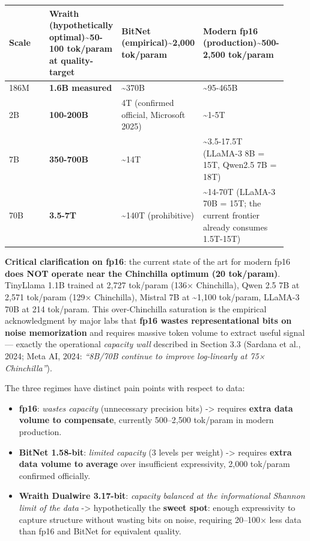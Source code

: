 {\def\LTcaptype{none} %
{\footnotesize\setlength{\tabcolsep}{3pt}
\begin{longtable}[]{@{}>{\raggedright\arraybackslash}p{0.230\linewidth}>{\raggedright\arraybackslash}p{0.230\linewidth}>{\raggedright\arraybackslash}p{0.230\linewidth}>{\raggedright\arraybackslash}p{0.230\linewidth}@{}}
\toprule\noalign{}
Scale & \textbf{Wraith (hypothetically optimal)}\textasciitilde50-100 tok/param
at quality-target & BitNet (empirical)\textasciitilde2,000 tok/param & Modern fp16 (production)\textasciitilde500-2,500 tok/param \\
\midrule\noalign{}
\endhead
\bottomrule\noalign{}
\endlastfoot
186M & \textbf{1.6B measured} & \textasciitilde370B &
\textasciitilde95-465B \\
2B & \textbf{100-200B} & 4T (confirmed official, Microsoft 2025) &
\textasciitilde1-5T \\
7B & \textbf{350-700B} & \textasciitilde14T & \textasciitilde3.5-17.5T
(LLaMA-3 8B = 15T, Qwen2.5 7B = 18T) \\
70B & \textbf{3.5-7T} & \textasciitilde140T (prohibitive) &
\textasciitilde14-70T (LLaMA-3 70B = 15T; the current frontier already
consumes 1.5T-15T) \\
\end{longtable}
}
}

\textbf{Critical clarification on fp16}: the current state of the art
for modern fp16 \textbf{does NOT operate near the Chinchilla optimum (20
tok/param)}. TinyLlama 1.1B trained at 2,727 tok/param (136×
Chinchilla), Qwen 2.5 7B at 2,571 tok/param (129× Chinchilla), Mistral
7B at \textasciitilde1,100 tok/param, LLaMA-3 70B at 214 tok/param. This
over-Chinchilla saturation is the empirical acknowledgment by major labs
that \textbf{fp16 wastes representational bits on noise memorization}
and requires massive token volume to extract useful signal --- exactly
the operational \emph{capacity wall} described in Section 3.3 (Sardana
et al., 2024; Meta AI, 2024: \emph{``8B/70B continue to improve
log-linearly at 75× Chinchilla''}).

The three regimes have distinct pain points with respect to data:

\begin{itemize}
\tightlist
\item
  \textbf{fp16}: \emph{wastes capacity} (unnecessary precision bits) ->
  requires \textbf{extra data volume to compensate}, currently
  500--2,500 tok/param in modern production.
\item
  \textbf{BitNet 1.58-bit}: \emph{limited capacity} (3 levels per
  weight) -> requires \textbf{extra data volume to average} over
  insufficient expressivity, 2,000 tok/param confirmed officially.
\item
  \textbf{Wraith Dualwire 3.17-bit}: \emph{capacity balanced at the
  informational Shannon limit of the data} -> hypothetically the
  \textbf{sweet spot}: enough expressivity to capture structure without
  wasting bits on noise, requiring 20--100× less data than fp16 and
  BitNet for equivalent quality.
\end{itemize}

